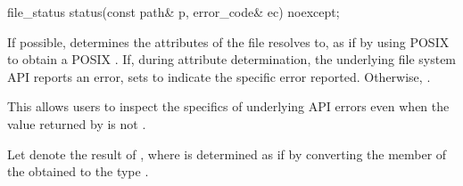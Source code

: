 \begin{itemdecl}
file_status status(const path& p, error_code& ec) noexcept;
\end{itemdecl}

\begin{itemdescr}
\pnum
\effects
If possible, determines the attributes
    of the file  resolves to, as if by using POSIX 
    to obtain a POSIX .
      If, during attribute determination, the underlying file system API reports
    an error, sets  to indicate the specific error reported.
    Otherwise, .
\begin{note} This allows users to inspect the specifics of underlying
      API errors even when the value returned by  is not
      . \end{note}

\pnum
Let  denote the result of ,
where  is determined as if by converting the  member
of the obtained  to the type .


\end{itemdescr}
